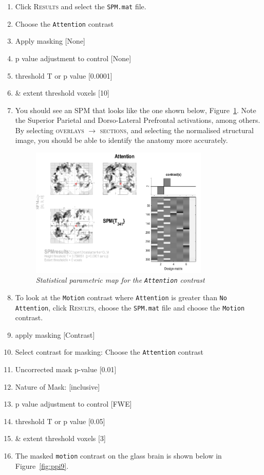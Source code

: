 \begin{enumerate}
\item Click \textsc{Results} and select the \texttt{SPM.mat} file.
\item Choose the \texttt{Attention} contrast
\item Apply masking [None]
\item p value adjustment to control [None]
\item threshold {T or p value} [0.0001]
\item \& extent threshold {voxels} [10]
\item You should see an SPM that looks like the one shown below, Figure~\ref{fig:ppi8}. Note the Superior Parietal and Dorso-Lateral Prefrontal activations, among others. By selecting \textsc{overlays} $\rightarrow$ \textsc{sections}, and selecting the normalised structural image, you should be able to identify the anatomy more accurately.

\begin{figure}[!ht]
\centering\includegraphics[width=85mm]{ppi/figures/Fig8.png}
\caption{\em Statistical parametric map for the \texttt{Attention} contrast}
\label{fig:ppi8}
\end{figure}

\item To look at the \texttt{Motion} contrast where \texttt{Attention} is greater than \texttt{No Attention}, click \textsc{Results}, choose the \texttt{SPM.mat} file and choose the \texttt{Motion} contrast.
\item apply masking [Contrast]
\item Select contrast for masking: Choose the \texttt{Attention} contrast
\item Uncorrected mask p-value [0.01]
\item Nature of Mask: [inclusive]
\item p value adjustment to control [FWE]
\item threshold {T or p value} [0.05]
\item \& extent threshold {voxels} [3]
\item The masked \texttt{motion} contrast on the glass brain is shown below in Figure~\ref{fig:ppi9}.


\end{enumerate}
